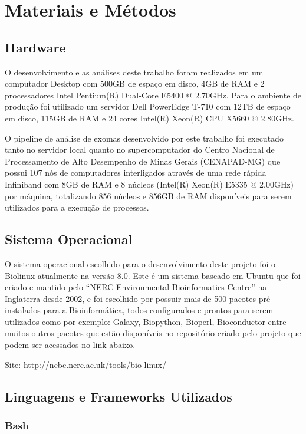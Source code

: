 \chapter[Materiais e Métodos]{Materiais e Métodos}

\section{Hardware}

O desenvolvimento e as análises deste trabalho foram realizados em um computador Desktop com 500GB de espaço em disco, 4GB de RAM e 2 processadores Intel Pentium(R) Dual-Core E5400 @ 2.70GHz. Para o ambiente de produção foi utilizado um servidor Dell PowerEdge T-710 com 12TB de espaço em disco, 115GB de RAM e 24 cores Intel(R) Xeon(R) CPU X5660 @ 2.80GHz.

O pipeline de análise de exomas desenvolvido por este trabalho foi executado tanto no servidor local quanto no supercomputador do Centro Nacional de Processamento de Alto Desempenho de Minas Gerais (CENAPAD-MG) que possui 107 nós de computadores interligados através de uma rede rápida Infiniband com 8GB de RAM e 8 núcleos (Intel(R) Xeon(R) E5335 @ 2.00GHz) por máquina, totalizando 856 núcleos e 856GB de RAM disponíveis para serem utilizados para a execução de processos.

\section{Sistema Operacional}

O sistema operacional escolhido para o desenvolvimento deste projeto foi o Biolinux \cite{Field2006} atualmente na versão 8.0. Este é um sistema baseado em Ubuntu que foi criado e mantido pelo ``NERC Environmental Bioinformatics Centre'' na Inglaterra desde 2002, e foi escolhido por possuir mais de 500 pacotes pré-instalados para a Bioinformática, todos configurados e prontos para serem utilizados como por exemplo: Galaxy, Biopython, Bioperl, Bioconductor entre muitos outros pacotes que estão disponíveis no repositório criado pelo projeto que podem ser acessados no link abaixo.

\noindent
Site: \url{http://nebc.nerc.ac.uk/tools/bio-linux/}

\section{Linguagens e Frameworks Utilizados}

\subsection{Bash}

